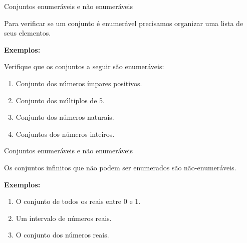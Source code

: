 \documentclass[aspectratio=169]{beamer}
\begin{document}
\begin{frame}{Conjuntos enumeráveis e não enumeráveis}

        Para verificar se um conjunto é enumerável precisamos
organizar uma lista de seus elementos.
    
\vspace{2mm}
    \textbf{Exemplos:}

    Verifique que os conjuntos a seguir são enumeráveis:

        \begin{enumerate}
            \item Conjunto dos números ímpares positivos.
            \item Conjunto dos múltiplos de 5.
            \item Conjunto dos números naturais.
            \item Conjuntos dos números inteiros.
        \end{enumerate}
        
    \end{frame}


    \begin{frame}{Conjuntos enumeráveis e não enumeráveis}

        Os conjuntos infinitos que não podem ser enumerados
são não-enumeráveis.
    
\vspace{2mm}
    \textbf{Exemplos:}

        \begin{enumerate}
            \item O conjunto de todos os reais entre 0 e 1.
            \item Um intervalo de números reais.
            \item O conjunto dos números reais.
        \end{enumerate}
        
    \end{frame}
\end{document}

